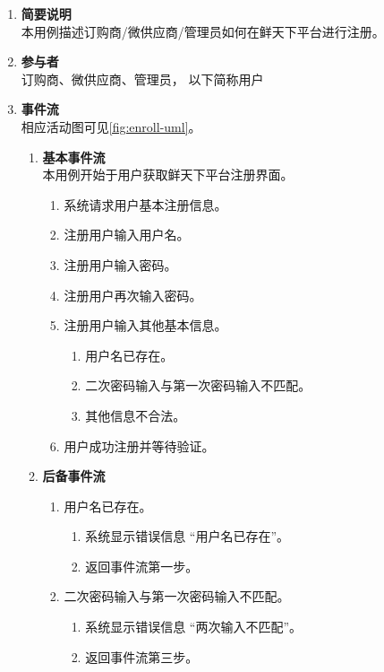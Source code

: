 \begin{enumerate}
    \item \textbf{简要说明}  \\ 本用例描述订购商/微供应商/管理员如何在鲜天下平台进行注册。
    \item \textbf{参与者} \\ 订购商、微供应商、管理员， 以下简称用户
    \item \textbf{事件流} \\ 相应活动图可见\autoref{fig:enroll-uml}。
    \begin{enumerate} 
        \item \textbf{基本事件流} \\ 本用例开始于用户获取鲜天下平台注册界面。
        \begin{enumerate}
            \item 系统请求用户基本注册信息。
            \item 注册用户输入用户名。
            \item 注册用户输入密码。
            \item 注册用户再次输入密码。
            \item 注册用户输入其他基本信息。
            \begin{enumerate}
                \item 用户名已存在。
                \item 二次密码输入与第一次密码输入不匹配。
                \item 其他信息不合法。
            \end{enumerate}
            \item 用户成功注册并等待验证。
        \end{enumerate}
        \item \textbf{后备事件流}
        \begin{enumerate}
            \item 用户名已存在。
            \begin{enumerate}
                \item 系统显示错误信息 “用户名已存在”。
                \item 返回事件流第一步。
            \end{enumerate}
            \item 二次密码输入与第一次密码输入不匹配。
            \begin{enumerate}
                \item 系统显示错误信息 “两次输入不匹配”。
                \item 返回事件流第三步。

\end{enumerate}
\end{enumerate}
\end{enumerate}
\end{enumerate}

